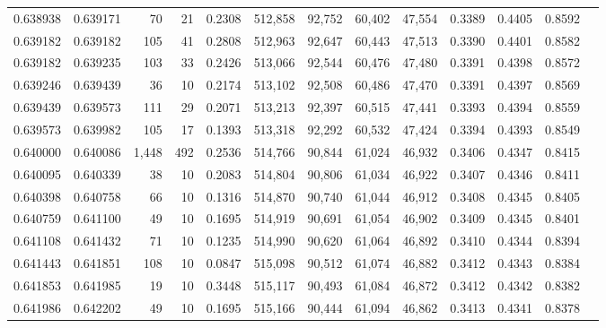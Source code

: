 \begin{tabular}{rrrrrrrrrrrrr}
0.638938 & 0.639171 &    70 &  21 &                                     0.2308 & 512,858 &  92,752 &  60,402 &  47,554 & 0.3389 & 0.4405 & 0.8592 \\
0.639182 & 0.639182 &   105 &  41 &                                     0.2808 & 512,963 &  92,647 &  60,443 &  47,513 & 0.3390 & 0.4401 & 0.8582 \\
0.639182 & 0.639235 &   103 &  33 &                                     0.2426 & 513,066 &  92,544 &  60,476 &  47,480 & 0.3391 & 0.4398 & 0.8572 \\
0.639246 & 0.639439 &    36 &  10 &                                     0.2174 & 513,102 &  92,508 &  60,486 &  47,470 & 0.3391 & 0.4397 & 0.8569 \\
0.639439 & 0.639573 &   111 &  29 &                                     0.2071 & 513,213 &  92,397 &  60,515 &  47,441 & 0.3393 & 0.4394 & 0.8559 \\
0.639573 & 0.639982 &   105 &  17 &                                     0.1393 & 513,318 &  92,292 &  60,532 &  47,424 & 0.3394 & 0.4393 & 0.8549 \\
0.640000 & 0.640086 & 1,448 & 492 &                                     0.2536 & 514,766 &  90,844 &  61,024 &  46,932 & 0.3406 & 0.4347 & 0.8415 \\
0.640095 & 0.640339 &    38 &  10 &                                     0.2083 & 514,804 &  90,806 &  61,034 &  46,922 & 0.3407 & 0.4346 & 0.8411 \\
0.640398 & 0.640758 &    66 &  10 &                                     0.1316 & 514,870 &  90,740 &  61,044 &  46,912 & 0.3408 & 0.4345 & 0.8405 \\
0.640759 & 0.641100 &    49 &  10 &                                     0.1695 & 514,919 &  90,691 &  61,054 &  46,902 & 0.3409 & 0.4345 & 0.8401 \\
0.641108 & 0.641432 &    71 &  10 &                                     0.1235 & 514,990 &  90,620 &  61,064 &  46,892 & 0.3410 & 0.4344 & 0.8394 \\
0.641443 & 0.641851 &   108 &  10 &                                     0.0847 & 515,098 &  90,512 &  61,074 &  46,882 & 0.3412 & 0.4343 & 0.8384 \\
0.641853 & 0.641985 &    19 &  10 &                                     0.3448 & 515,117 &  90,493 &  61,084 &  46,872 & 0.3412 & 0.4342 & 0.8382 \\
0.641986 & 0.642202 &    49 &  10 &                                     0.1695 & 515,166 &  90,444 &  61,094 &  46,862 & 0.3413 & 0.4341 & 0.8378 \\

\end{tabular}
